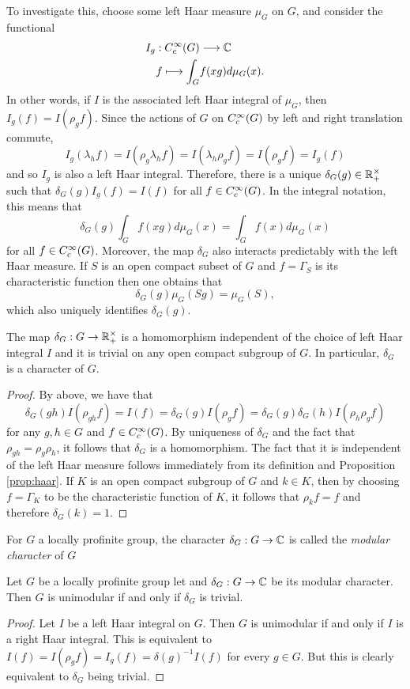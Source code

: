 To investigate this, choose some left Haar measure $\mu_G$ on $G$, and consider the functional
\begin{align*}
    I_g:C_c^{\infty}(G)&\longrightarrow\mathbb{C}\\
    f\longmapsto\int_G& f(xg)d\mu_G(x).
\end{align*}
In other words, if $I$ is the associated left Haar integral of $\mu_G$, then $I_g(f)=I(\rho_g f)$. Since the actions of $G$ on $C_c^{\infty}(G)$ by left and right translation commute, $$I_g(\lambda_h f)=I(\rho_g\lambda_h f)=I(\lambda_h\rho_g f)=I(\rho_g f)=I_g(f)$$
and so $I_g$ is also a left Haar integral. Therefore, there is a unique $\delta_G(g)\in \mathbb{R}_+^{\times}$ such that $\delta_G(g)I_g(f)=I(f)$ for all $f\in C_c^{\infty}(G)$. In the integral notation, this means that 
$$\delta_G(g)\int_G f(xg)d\mu_G(x)=\int_G f(x)d\mu_G(x)$$
for all $f\in C_c^{\infty}(G)$. Moreover, the map $\delta_G$ also interacts predictably with the left Haar measure. If $S$ is an open compact subset of $G$ and $f=\Gamma_S$ is its characteristic function then one obtains that 
$$\delta_G(g)\mu_G(Sg)=\mu_G(S),$$
which also uniquely identifies $\delta_G(g)$.

\begin{lemma}
    The map $\delta_G:G\to\mathbb{R}_+^{\times}$ is a homomorphism independent of the choice of left Haar integral $I$ and it is trivial on any open compact subgroup of $G$. In particular, $\delta_G$ is a character of $G$.
\end{lemma}
\begin{proof}
    By above, we have that 
    $$\delta_G(gh)I(\rho_{gh}f)=I(f)=\delta_G(g)I(\rho_g f)=\delta_G(g)\delta_G(h)I(\rho_h\rho_g f)$$
    for any $g,h\in G$ and $f\in C_c^{\infty}(G)$.
    By uniqueness of $\delta_G$ and the fact that $\rho_{gh}=\rho_g\rho_h$, it follows that $\delta_G$ is a homomorphism. The fact that it is independent of the left Haar measure follows immediately from its definition and Proposition \ref{prop:haar}. 
    If $K$ is an open compact subgroup of $G$ and $k\in K$, then by choosing $f=\Gamma_K$ to be the characteristic function of $K$, it follows that $\rho_k f= f$ and therefore $\delta_G(k)=1$.
\end{proof}

\begin{defn}
    For $G$ a locally profinite group, the character $\delta_G:G\to\mathbb{C}$ is called the \textit{modular character} of $G$
\end{defn}


\begin{lemma}
    Let $G$ be a locally profinite group let and $\delta_G:G\to\mathbb{C}$ be its modular character. Then $G$ is unimodular if and only if $\delta_G$ is trivial. 
\end{lemma}
\begin{proof}
    Let $I$ be a left Haar integral on $G$. Then $G$ is unimodular if and only if $I$ is a right Haar integral. This is equivalent to $I(f)=I(\rho_g f)=I_g(f)=\delta(g)^{-1}I(f)$ for every $g\in G$. But this is clearly equivalent to $\delta_G$ being trivial. 
\end{proof}

